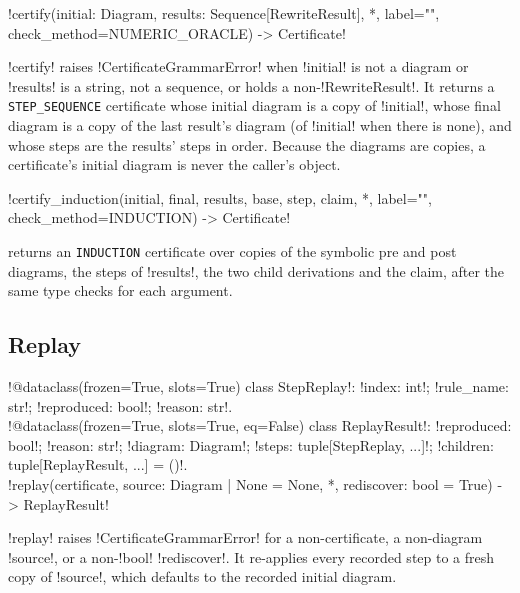 \begin{signature}
\py!certify(initial: Diagram, results: Sequence[RewriteResult], *, label="", check_method=NUMERIC_ORACLE) -> Certificate!
\end{signature}
\py!certify! raises \py!CertificateGrammarError! when \py!initial! is not a diagram or \py!results! is a string, not a sequence, or holds a non-\py!RewriteResult!. It returns a \texttt{STEP\_SEQUENCE} certificate whose initial diagram is a copy of \py!initial!, whose final diagram is a copy of the last result's diagram (of \py!initial! when there is none), and whose steps are the results' steps in order. Because the diagrams are copies, a certificate's initial diagram is never the caller's object.

\begin{signature}
\py!certify_induction(initial, final, results, base, step, claim, *, label="", check_method=INDUCTION) -> Certificate!
\end{signature}
returns an \texttt{INDUCTION} certificate over copies of the symbolic pre and post diagrams, the steps of \py!results!, the two child derivations and the claim, after the same type checks for each argument.

\subsection{Replay}

\begin{signature}
\py!@dataclass(frozen=True, slots=True) class StepReplay!: \py!index: int!; \py!rule_name: str!; \py!reproduced: bool!; \py!reason: str!.\\
\py!@dataclass(frozen=True, slots=True, eq=False) class ReplayResult!: \py!reproduced: bool!; \py!reason: str!; \py!diagram: Diagram!; \py!steps: tuple[StepReplay, ...]!; \py!children: tuple[ReplayResult, ...] = ()!.\\
\py!replay(certificate, source: Diagram | None = None, *, rediscover: bool = True) -> ReplayResult!
\end{signature}

\py!replay! raises \py!CertificateGrammarError! for a non-certificate, a non-diagram \py!source!, or a non-\py!bool! \py!rediscover!. It re-applies every recorded step to a fresh copy of \py!source!, which defaults to the recorded initial diagram.


